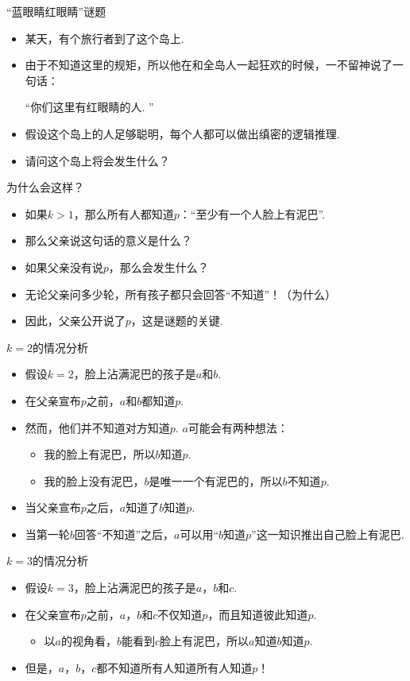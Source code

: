 {“蓝眼睛红眼睛”谜题}
\begin{itemize}
    \item 某天，有个旅行者到了这个岛上. 
    \item 由于不知道这里的规矩，所以他在和全岛人一起狂欢的时候，一不留神说了一句话：
    \begin{center}
        “你们这里有红眼睛的人. ”
    \end{center}
    \item 假设这个岛上的人足够聪明，每个人都可以做出缜密的逻辑推理. 
    \item 请问这个岛上将会发生什么？
\end{itemize}


{为什么会这样？}
\begin{itemize}
    \item 如果$k>1$，那么所有人都知道$p$：“至少有一个人脸上有泥巴”.
    \item 那么父亲说这句话的意义是什么？
    \item 如果父亲没有说$p$，那么会发生什么？
    \item 无论父亲问多少轮，所有孩子都只会回答“不知道”！（为什么）%
    \item 因此，父亲公开说了$p$，这是谜题的关键.
\end{itemize}


{$k=2$的情况分析}
\begin{itemize}
    \item 假设$k=2$，脸上沾满泥巴的孩子是$a$和$b$. 
    \item 在父亲宣布$p$之前，$a$和$b$都知道$p$.
    \item 然而，他们并不知道对方知道$p$. $a$可能会有两种想法：
    \begin{itemize}
        \item 我的脸上有泥巴，所以$b$知道$p$.
        \item 我的脸上没有泥巴，$b$是唯一一个有泥巴的，所以$b$不知道$p$.
    \end{itemize}
    \item 当父亲宣布$p$之后，$a$知道了$b$知道$p$.
    \item 当第一轮$b$回答“不知道”之后，$a$可以用“$b$知道$p$”这一知识推出自己脸上有泥巴.
\end{itemize}


{$k=3$的情况分析}
\begin{itemize}
    \item 假设$k=3$，脸上沾满泥巴的孩子是$a$，$b$和$c$. 
    \item 在父亲宣布$p$之前，$a$，$b$和$c$不仅知道$p$，而且知道彼此知道$p$.
    \begin{itemize}
        \item 以$a$的视角看，$b$能看到$c$脸上有泥巴，所以$a$知道$b$知道$p$.
    \end{itemize}
    \item 但是，$a$，$b$，$c$都不知道所有人知道所有人知道$p$！
\end{itemize}


